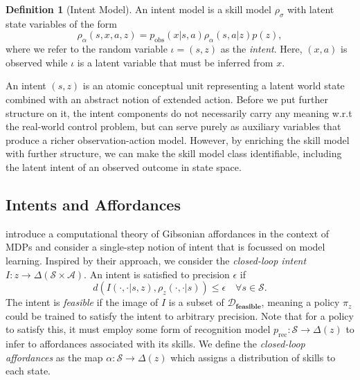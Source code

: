 \documentclass{article}
\theoremstyle{plain}
\theoremstyle{definition}
\newtheorem{definition}[theorem]{Definition}
\theoremstyle{remark}
\newcommand{\sS}{\mathcal{S}}
\newcommand{\sA}{\mathcal{A}}
\newcommand{\dist}[1]{\Delta({#1})}
\newcommand{\cD}{\mathcal{D}}
\begin{document}
\begin{definition}[Intent Model]
An intent model is a skill model $\rho_\sigma$ with latent state variables of the form
\begin{equation}
        \rho_\alpha(s, x,a,z) = p_\text{obs}(x|s,a)\rho_\alpha(s,a|z)p(z),
\end{equation}
where we refer to the random variable $\iota = (s,z)$ as the \emph{intent}. Here, $(x,a)$ is observed while $\iota$ is a latent variable that must be inferred from $x$.
\end{definition}

An intent $(s,z)$ is an atomic conceptual unit representing a latent world state combined with an abstract notion of extended action. Before we put further structure on it, the intent components do not necessarily carry any meaning w.r.t the real-world control problem, but can serve purely as auxiliary variables that produce a richer observation-action model. However, by enriching the skill model with further structure, we can make the skill model class identifiable, including the latent intent of an observed outcome in state space.

\subsection{Intents and Affordances}
\citep{khetarpal2020can} introduce a computational theory of Gibsonian affordances in the context of MDPs and consider a single-step notion of intent that is focussed on model learning. Inspired by their approach, we consider the \emph{closed-loop intent} $I: z \to \dist{\sS\times\sA}$. An intent is satisfied to precision $\epsilon$ if 
\begin{equation}
    d(I(\cdot,\cdot|s,z), \rho_z(\cdot,\cdot|s)) \leq \epsilon \quad \forall s\in\sS.
\end{equation}
The intent is \emph{feasible} if the image of $I$ is a subset of $\cD_\textbf{feasible}$, meaning a policy $\pi_z$ could be trained to satisfy the intent to arbitrary precision.
Note that for a policy to satisfy this, it must employ some form of recognition model $p_\text{rec}: \sS \to \dist{z}$ to infer to affordances associated with its skills. We define the \emph{closed-loop affordances} as the map $\alpha: \mathcal{S}\to\dist{z}$ which assigns a distribution of skills to each state.
\end{document}
